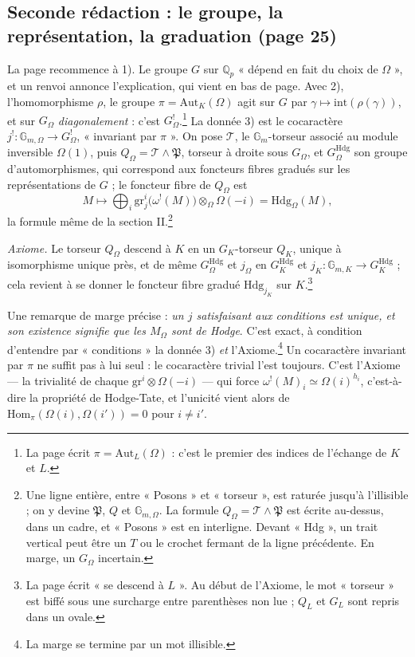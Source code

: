 \documentclass[11pt,a4paper]{article}
\begin{document}
\subsection*{Seconde rédaction : le groupe, la représentation, la graduation (page 25)}

La page recommence à 1). Le groupe $G$ sur $\mathbb{Q}_p$ « dépend en fait du
choix de $\Omega$ », et un renvoi annonce l'explication, qui vient en bas de
page. Avec 2), l'homomorphisme $\rho$, le groupe $\pi = \mathrm{Aut}_K(\Omega)$
agit sur $G$ par $\gamma \mapsto \mathrm{int}(\rho(\gamma))$, et sur
$G_{\Omega}$ \emph{diagonalement} : c'est $G^{!}_{\Omega}$.\footnote{La page
écrit $\pi = \mathrm{Aut}_L(\Omega)$ : c'est le premier des indices de
l'échange de $K$ et $L$.} La donnée 3) est le cocaractère $j^{!} :
\mathbb{G}_{m,\Omega} \to G^{!}_{\Omega}$, « invariant par $\pi$ ». On pose
$\mathcal{T}$, le $\mathbb{G}_m$-torseur associé au module inversible
$\Omega(1)$, puis $Q_{\Omega} = \mathcal{T} \wedge \mathfrak{P}$, torseur à
droite sous $G_{\Omega}$, et $G^{\mathrm{Hdg}}_{\Omega}$ son groupe
d'automorphismes, qui correspond aux foncteurs fibres gradués sur les
représentations de $G$ ; le foncteur fibre de $Q_{\Omega}$ est
\[
M \longmapsto \bigoplus_i \mathrm{gr}^{i}_{j}\bigl(\omega^{!}(M)\bigr)
\otimes_{\Omega} \Omega(-i) = \mathrm{Hdg}_{\Omega}(M),
\]
la formule même de la section II.\footnote{Une ligne entière, entre « Posons »
et « torseur », est raturée jusqu'à l'illisible ; on y devine
$\mathfrak{P}$, $Q$ et $\mathbb{G}_{m,\Omega}$. La formule $Q_{\Omega} =
\mathcal{T} \wedge \mathfrak{P}$ est écrite au-dessus, dans un cadre, et
« Posons » est en interligne. Devant « Hdg », un trait vertical peut être un
$T$ ou le crochet fermant de la ligne précédente. En marge, un $G_{\Omega}$
incertain.}

\emph{Axiome.} Le torseur $Q_{\Omega}$ descend à $K$ en un $G_K$-torseur $Q_K$,
unique à isomorphisme unique près, et de même $G^{\mathrm{Hdg}}_{\Omega}$ et
$j_{\Omega}$ en $G^{\mathrm{Hdg}}_K$ et $j_K : \mathbb{G}_{m,K} \to
G^{\mathrm{Hdg}}_K$ ; cela revient à se donner le foncteur fibre gradué
$\mathrm{Hdg}_{j_K}$ sur $K$.\footnote{La page écrit « se descend à $L$ ». Au
début de l'Axiome, le mot « torseur » est biffé sous une surcharge entre
parenthèses non lue ; $Q_L$ et $G_L$ sont repris dans un ovale.}

Une remarque de marge précise : \emph{un $j$ satisfaisant aux conditions est
unique, et son existence signifie que les $M_{\Omega}$ sont de Hodge}.
C'est exact, à condition d'entendre par « conditions » la donnée 3)
\emph{et} l'Axiome.\footnote{La marge se termine par un mot illisible.} Un
cocaractère invariant par $\pi$ ne suffit pas à lui seul : le cocaractère
trivial l'est toujours. C'est l'Axiome --- la trivialité de chaque
$\mathrm{gr}^i \otimes \Omega(-i)$ --- qui force $\omega^{!}(M)_i \simeq
\Omega(i)^{h_i}$, c'est-à-dire la propriété de Hodge-Tate, et l'unicité vient
alors de $\mathrm{Hom}_{\pi}(\Omega(i), \Omega(i')) = 0$ pour $i \neq i'$.
\end{document}

